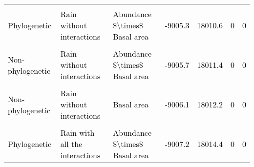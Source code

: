 \documentclass[
  12pt,
  letterpaper,
  DIV=11,
  numbers=noendperiod]{scrartcl}
\begin{document}
\begin{table}[H]
{\begin{tabular}[t]{lllllll}
\cellcolor{gray!6}{\textcolor{gray}{Non-phylogenetic}} & \cellcolor{gray!6}{\textcolor{gray}{Rain with all the interactions}} & \cellcolor{gray!6}{\textcolor{gray}{Abundance \$\textbackslash{}times\$ Basal area}} & \cellcolor{gray!6}{\textcolor{gray}{-9005.0}} & \cellcolor{gray!6}{\textcolor{gray}{18010.1}} & \cellcolor{gray!6}{\textcolor{gray}{2}} & \cellcolor{gray!6}{\textcolor{gray}{0}}\\
\textcolor{black}{Phylogenetic} & \textcolor{black}{Rain without interactions} & \textcolor{black}{Abundance \$\textbackslash{}times\$ Basal area} & \textcolor{black}{-9005.3} & \textcolor{black}{18010.6} & \textcolor{black}{0} & \textcolor{black}{0}\\
\cellcolor{gray!6}{\textcolor{black}{Non-phylogenetic}} & \cellcolor{gray!6}{\textcolor{black}{Rain without interactions}} & \cellcolor{gray!6}{\textcolor{black}{Abundance}} & \cellcolor{gray!6}{\textcolor{black}{-9005.4}} & \cellcolor{gray!6}{\textcolor{black}{18010.7}} & \cellcolor{gray!6}{\textcolor{black}{0}} & \cellcolor{gray!6}{\textcolor{black}{0}}\\
\textcolor{black}{Non-phylogenetic} & \textcolor{black}{Rain without interactions} & \textcolor{black}{Abundance \$\textbackslash{}times\$ Basal area} & \textcolor{black}{-9005.7} & \textcolor{black}{18011.4} & \textcolor{black}{0} & \textcolor{black}{0}\\
\addlinespace
\cellcolor{gray!6}{\textcolor{black}{Phylogenetic}} & \cellcolor{gray!6}{\textcolor{black}{Rain without interactions}} & \cellcolor{gray!6}{\textcolor{black}{Abundance}} & \cellcolor{gray!6}{\textcolor{black}{-9005.8}} & \cellcolor{gray!6}{\textcolor{black}{18011.6}} & \cellcolor{gray!6}{\textcolor{black}{0}} & \cellcolor{gray!6}{\textcolor{black}{0}}\\
\textcolor{black}{Non-phylogenetic} & \textcolor{black}{Rain without interactions} & \textcolor{black}{Basal area} & \textcolor{black}{-9006.1} & \textcolor{black}{18012.2} & \textcolor{black}{0} & \textcolor{black}{0}\\
\cellcolor{gray!6}{\textcolor{black}{Phylogenetic}} & \cellcolor{gray!6}{\textcolor{black}{Rain without interactions}} & \cellcolor{gray!6}{\textcolor{black}{Basal area}} & \cellcolor{gray!6}{\textcolor{black}{-9006.9}} & \cellcolor{gray!6}{\textcolor{black}{18013.8}} & \cellcolor{gray!6}{\textcolor{black}{0}} & \cellcolor{gray!6}{\textcolor{black}{0}}\\
\textcolor{black}{Phylogenetic} & \textcolor{black}{Rain with all the interactions} & \textcolor{black}{Abundance \$\textbackslash{}times\$ Basal area} & \textcolor{black}{-9007.2} & \textcolor{black}{18014.4} & \textcolor{black}{0} & \textcolor{black}{0}\\

\end{tabular}}
\end{table}
\end{document}
